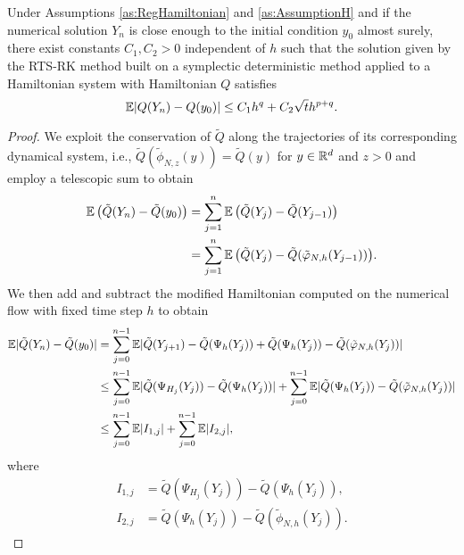 \documentclass[10pt]{article}
\begin{document}
\begin{theorem}\label{thm:RTSHamiltonian} Under Assumptions \ref{as:RegHamiltonian} and \ref{as:AssumptionH} and if the numerical solution $Y_n$ is close enough to the initial condition $y_0$ almost surely, there exist constants $C_1, C_2 > 0$ independent of $h$ such that the solution given by the RTS-RK method built on a symplectic deterministic method applied to a Hamiltonian system with Hamiltonian $Q$ satisfies
	\begin{equation}
		\operatorname{\mathbb{E}} \lvert Q(Y_n) - Q(y_0)\rvert \leq C_1 h^q + C_2 \sqrt{t} h^{p+q}.
	\end{equation}
\end{theorem}
\begin{proof} We exploit the conservation of $\tilde Q$ along the trajectories of its corresponding dynamical system, i.e., $\tilde Q (\tilde \phi_{N,z} (y)) = \tilde Q(y)$ for $y \in \mathbb{R}^d$ and $z > 0$ and employ a telescopic sum to obtain
\begin{equation}
\begin{aligned}
	\operatorname{\mathbb{E}} \big(\tilde Q(Y_n) - \tilde Q(y_0)\big) &= \sum_{j=1}^{n} \operatorname{\mathbb{E}}\big(\tilde Q(Y_{j}) - \tilde Q(Y_{j-1})\big) \\
	&= \sum_{j=1}^{n} \operatorname{\mathbb{E}} \big(\tilde Q(Y_j) - \tilde Q(\tilde{\varphi}_{N, h}(Y_{j-1}))\big).
\end{aligned}
\end{equation}
We then add and subtract the modified Hamiltonian computed on the numerical flow with fixed time step $h$ to obtain
\begin{equation}
\begin{aligned}
	\operatorname{\mathbb{E}} \lvert\tilde Q(Y_n) - \tilde Q(y_0)\rvert &= \sum_{j=0}^{n-1} \operatorname{\mathbb{E}} \lvert\tilde Q(Y_{j+1}) - \tilde Q(\Psi_h(Y_j)) + \tilde Q(\Psi_h(Y_j)) - \tilde Q(\tilde{\varphi}_{N, h}(Y_j))\rvert \\
	&\leq \sum_{j=0}^{n-1} \operatorname{\mathbb{E}} \lvert\tilde Q(\Psi_{H_j}(Y_j)) - \tilde Q(\Psi_h(Y_j))\rvert + \sum_{j=0}^{n-1} \operatorname{\mathbb{E}} \lvert\tilde Q(\Psi_h(Y_j)) - \tilde Q(\tilde{\varphi}_{N, h}(Y_j))\rvert\\
	&\leq \sum_{j=0}^{n-1} \operatorname{\mathbb{E}} \lvert I_{1,j}\rvert + \sum_{j=0}^{n-1} \operatorname{\mathbb{E}} \lvert I_{2,j}\rvert,
\end{aligned}
\end{equation}
where
\begin{equation}
\begin{aligned}
	I_{1,j} &= \tilde Q(\Psi_{H_j}(Y_j)) - \tilde Q(\Psi_h(Y_j)), \\
	I_{2,j} &= \tilde Q(\Psi_h(Y_j)) - \tilde Q(\tilde\phi_{N, h}(Y_j)).
\end{aligned}

\end{equation}
\end{proof}
\end{document}
